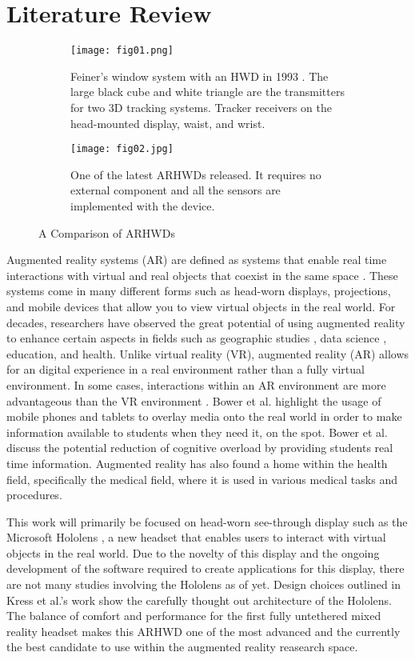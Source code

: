 \section{Literature Review}
\label{sec:literaturereview}

\begin{figure}[h!]
  \centering
  \begin{subfigure}[b]{0.6\textwidth}
    \texttt{[image: fig01.png]}
    \caption{Feiner's window system with an HWD in 1993 \cite{Feiner1993}. The large black cube and white triangle are the transmitters for two 3D tracking systems. Tracker receivers on the head-mounted display, waist, and wrist.}
  \end{subfigure}
  \begin{subfigure}[b]{0.6\textwidth}
    \texttt{[image: fig02.jpg]}
    \caption{One of the latest ARHWDs released. It requires no external component and all the sensors are implemented with the device.}
  \end{subfigure}
  \caption{A Comparison of ARHWDs}
  \label{fig:compareARHWD}
\end{figure}

Augmented reality systems (AR) are defined as systems that enable real time interactions with virtual and real objects that coexist in the same space \cite{Azuma1997}. These systems come in many different forms such as head-worn displays, projections, and mobile devices that allow you to view virtual objects in the real world. For decades, researchers have observed the great potential of using augmented reality to enhance certain aspects in fields such as geographic studies \cite{Wang2018}, data science \cite{Zhang2018}, education, and health. Unlike virtual reality (VR), augmented reality (AR) allows for an digital experience in a real environment rather than a fully virtual environment. In some cases, interactions within an AR environment are more advantageous than the VR environment \cite{Krichenbauer2017}. Bower et al. \cite{Bower2014} highlight the usage of mobile phones and tablets to overlay media onto the real world in order to make information available to students when they need it, on the spot. Bower et al. discuss the potential reduction of cognitive overload by providing students real time information. Augmented reality has also found a home within the health field, specifically the medical field, where it is used in various medical tasks and procedures.

This work will primarily be focused on head-worn see-through display such as the Microsoft Hololens \cite{Hololens}, a new headset that enables users to interact with virtual objects in the real world. Due to the novelty of this display and the ongoing development of the software required to create applications for this display, there are not many studies involving the Hololens as of yet. Design choices outlined in Kress et al.'s work \cite{Kress2017} show the carefully thought out architecture of the Hololens. The balance of comfort and performance for the first fully untethered mixed reality headset makes this ARHWD one of the most advanced and the currently the best candidate to use within the augmented reality reasearch space. 

